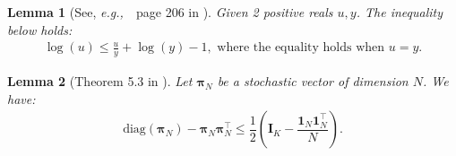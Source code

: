 \documentclass{article}
\def\eg{{\em e.g.,~}}
\newcommand{\nn}{\nonumber} %
\def\pib         {{\sbmm{\pi}}\XS}                 \def\Pib        {{\sbmm{\Pi}}\XS}
\def\XS{\xspace}
\def\sbmm#1{\ensuremath{\boldsymbol{#1}}}
\newtheorem{lemma}{Lemma}
\def\evu{{u}}
\def\mI{{\bm{I}}}
\begin{document}
\begin{lemma}[See, \eg~page 206 in \cite{lange_numerical_2010}]
    Given 2 positive reals $\evu, y$. The inequality below holds:
\begin{align} 
\label{multi_D_inq3}
	\log(\evu) \leq \frac{\evu}{y} + \log(y)-1, \text{ where the equality holds when $\evu=y$.}\nn
\end{align}
\end{lemma}

\begin{lemma}[Theorem 5.3 in \cite{bohning1988monotonicity}]\label{upperbound_H_fastMM}
    Let $\pib_N$ be a stochastic vector of dimension $N$. We have:
    \begin{align*}
        \text{diag}(\pib_N)-\pib_N\pib_N^{\top}\leq \dfrac{1}{2}\left(\mI_K-\dfrac{\bm{1}_N\bm{1}_N^{\top}}{N}\right).
    \end{align*}
\end{lemma}



% 
% 

% 

\end{document}
